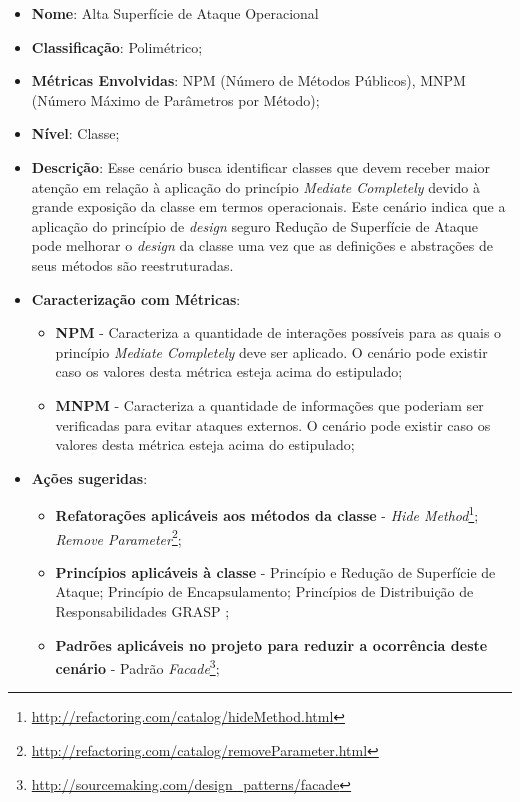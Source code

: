 \begin{itemize}
\item \textbf{Nome}: Alta Superfície de Ataque Operacional
\item \textbf{Classificação}: Polimétrico;
\item \textbf{Métricas Envolvidas}: NPM (Número de Métodos Públicos), MNPM (Número Máximo de Parâmetros por Método); 
\item \textbf{Nível}: Classe;
\item \textbf{Descrição}: Esse cenário busca identificar classes que devem receber maior atenção em relação à aplicação do princípio \emph{Mediate Completely} devido à grande exposição da classe em termos operacionais. Este cenário indica que a aplicação do princípio de \emph{design} seguro Redução de Superfície de Ataque pode melhorar o \emph{design} da classe uma vez que as definições e abstrações de seus métodos são reestruturadas.
\item \textbf{Caracterização com Métricas}: 
	\begin{itemize}
	\item \textbf{NPM} - Caracteriza a quantidade de interações possíveis para as quais o princípio \emph{Mediate Completely} deve ser aplicado. O cenário pode existir caso os valores desta métrica esteja acima do estipulado;
	\item \textbf{MNPM} - Caracteriza a quantidade de informações que poderiam ser verificadas para evitar ataques externos. O cenário pode existir caso os valores desta métrica esteja acima do estipulado; 
	\end{itemize}
\item \textbf{Ações sugeridas}: 
	\begin{itemize}
	\item \textbf{Refatorações aplicáveis aos métodos da classe} - \emph{Hide Method}\footnote{\url{http://refactoring.com/catalog/hideMethod.html}}; \emph{Remove Parameter}\footnote{\url{http://refactoring.com/catalog/removeParameter.html}};
	\item \textbf{Princípios aplicáveis à classe} - Princípio e Redução de Superfície de Ataque; Princípio de Encapsulamento; Princípios de Distribuição de Responsabilidades GRASP \cite{larman2007};
	\item \textbf{Padrões aplicáveis no projeto para reduzir a ocorrência deste cenário} - Padrão \emph{Facade}\footnote{\url{http://sourcemaking.com/design_patterns/facade}};
	\end{itemize}
\end{itemize}

